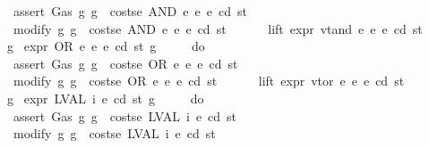 \begin{isabellebody}
\ \ \ \ \ \ assert\ Gas\ {\isacharparenleft}{\kern0pt}{\isasymlambda}g{\isachardot}{\kern0pt}\ g\ {\isachargreater}{\kern0pt}\ costs\isactrlsub e\ {\isacharparenleft}{\kern0pt}AND\ e{}\ e{}{\isacharparenright}{\kern0pt}\ e\ cd\ st{\isacharparenright}{\kern0pt}{\isacharsemicolon}{\kern0pt}\isanewline
\ \ \ \ \ \ modify\ {\isacharparenleft}{\kern0pt}{\isasymlambda}g{\isachardot}{\kern0pt}\ g\ {\isacharminus}{\kern0pt}\ costs\isactrlsub e\ {\isacharparenleft}{\kern0pt}AND\ e{}\ e{}{\isacharparenright}{\kern0pt}\ e\ cd\ st{\isacharparenright}{\kern0pt}{\isacharsemicolon}{\kern0pt}\isanewline
\ \ \ \ \ \ lift\ expr\ vtand\ e{}\ e{}\ e\ cd\ st\isanewline
\ \ \ \ {\isacharbraceright}{\kern0pt}{\isacharparenright}{\kern0pt}\ g{\isachardoublequoteclose}\isanewline
{\isacharbar}{\kern0pt}\ {\isachardoublequoteopen}expr\ {\isacharparenleft}{\kern0pt}OR\ e{}\ e{}{\isacharparenright}{\kern0pt}\ e\ cd\ st\ g\ {\isacharequal}{\kern0pt}\isanewline
\ \ \ \ {\isacharparenleft}{\kern0pt}do\ {\isacharbraceleft}{\kern0pt}\isanewline
\ \ \ \ \ \ assert\ Gas\ {\isacharparenleft}{\kern0pt}{\isasymlambda}g{\isachardot}{\kern0pt}\ g\ {\isachargreater}{\kern0pt}\ costs\isactrlsub e\ {\isacharparenleft}{\kern0pt}OR\ e{}\ e{}{\isacharparenright}{\kern0pt}\ e\ cd\ st{\isacharparenright}{\kern0pt}{\isacharsemicolon}{\kern0pt}\isanewline
\ \ \ \ \ \ modify\ {\isacharparenleft}{\kern0pt}{\isasymlambda}g{\isachardot}{\kern0pt}\ g\ {\isacharminus}{\kern0pt}\ costs\isactrlsub e\ {\isacharparenleft}{\kern0pt}OR\ e{}\ e{}{\isacharparenright}{\kern0pt}\ e\ cd\ st{\isacharparenright}{\kern0pt}{\isacharsemicolon}{\kern0pt}\isanewline
\ \ \ \ \ \ lift\ expr\ vtor\ e{}\ e{}\ e\ cd\ st\isanewline
\ \ \ \ {\isacharbraceright}{\kern0pt}{\isacharparenright}{\kern0pt}\ g{\isachardoublequoteclose}\isanewline
{\isacharbar}{\kern0pt}\ {\isachardoublequoteopen}expr\ {\isacharparenleft}{\kern0pt}LVAL\ i{\isacharparenright}{\kern0pt}\ e\ cd\ st\ g\ {\isacharequal}{\kern0pt}\isanewline
\ \ \ \ {\isacharparenleft}{\kern0pt}do\ {\isacharbraceleft}{\kern0pt}\isanewline
\ \ \ \ \ \ assert\ Gas\ {\isacharparenleft}{\kern0pt}{\isasymlambda}g{\isachardot}{\kern0pt}\ g\ {\isachargreater}{\kern0pt}\ costs\isactrlsub e\ {\isacharparenleft}{\kern0pt}LVAL\ i{\isacharparenright}{\kern0pt}\ e\ cd\ st{\isacharparenright}{\kern0pt}{\isacharsemicolon}{\kern0pt}\isanewline
\ \ \ \ \ \ modify\ {\isacharparenleft}{\kern0pt}{\isasymlambda}g{\isachardot}{\kern0pt}\ g\ {\isacharminus}{\kern0pt}\ costs\isactrlsub e\ {\isacharparenleft}{\kern0pt}LVAL\ i{\isacharparenright}{\kern0pt}\ e\ cd\ st{\isacharparenright}{\kern0pt}{\isacharsemicolon}{\kern0pt}\isanewline

\end{isabellebody}

